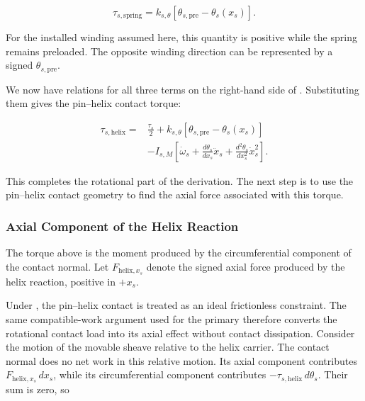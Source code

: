 \documentclass[11pt]{report}
\numberwithin{equation}{section}
\newcounter{assump}
\begin{document}
\begin{equation}
    \tau_{s,\mathrm{spring}}
    =
    k_{s,\theta}
    \left[
        \theta_{s,\mathrm{pre}}-\theta_s(x_s)
    \right].
    \label{eq:secondary_torsional_spring_torque}
\end{equation}

For the installed winding assumed here, this quantity is positive while the
spring remains preloaded. The opposite winding direction can be represented
by a signed \(\theta_{s,\mathrm{pre}}\).

We now have relations for all three terms on the right-hand side of
. Substituting them gives
the pin--helix contact torque:

\begin{equation}
\begin{aligned}
    \tau_{s,\mathrm{helix}}
    ={}&
    \frac{\tau_s}{2}
    +
    k_{s,\theta}
    \left[
        \theta_{s,\mathrm{pre}}-\theta_s(x_s)
    \right]
    \\
    &-
    I_{s,M}
    \left[
        \dot\omega_s
        +
        \frac{d\theta_s}{dx_s}\ddot x_s
        +
        \frac{d^2\theta_s}{dx_s^2}\dot x_s^2
        \right].
\end{aligned}
    \label{eq:secondary_reacted_helix_torque}
\end{equation}

This completes the rotational part of the derivation. The next step is to use
the pin--helix contact geometry to find the axial force associated with this
torque.

\subsubsection{Axial Component of the Helix Reaction}
\label{sec:secondary_helix_closing_force}

The torque above is the moment produced by the circumferential component of
the contact normal. Let \(F_{\mathrm{helix},x_s}\) denote the signed axial force
produced by the helix reaction, positive in \(+x_s\).

Under , the pin--helix contact is
treated as an ideal frictionless constraint. The same compatible-work argument
used for the primary therefore converts the rotational contact load into its
axial effect without contact dissipation. Consider the motion of the movable
sheave relative to the helix carrier. The contact normal does no net work in
this relative motion. Its axial component
contributes \(F_{\mathrm{helix},x_s}\,dx_s\), while its circumferential
component contributes
\(-\tau_{s,\mathrm{helix}}\,d\theta_s\). Their sum is zero, so
\end{document}
